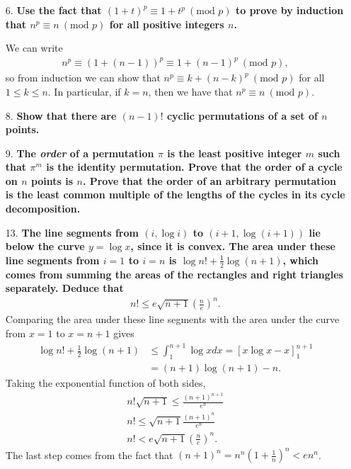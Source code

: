 \documentclass[a4paper,12pt]{article}
\begin{document}
\begin{enumerate}
    \item[6.]
        \boldmath
        \textbf{Use the fact that $(1 + t)^p \equiv 1 + t^p \ (\text{mod } p)$ to prove by induction that $n^p \equiv n \ (\text{mod } p)$ for all positive integers $n$.} \par
        \unboldmath
        We can write
        \begin{align*}
            n^p \equiv (1 + (n - 1))^p \equiv 1 + (n - 1)^p \ (\text{mod } p),
        \end{align*}
        so from induction we can show that $n^p \equiv k + (n - k)^p \ (\text{mod } p)$ for all $1 \leq k \leq n$. In particular, if $k = n$, then we have that $n^p \equiv n\ (\text{mod } p)$.

    \item[8.]
        \boldmath
        \textbf{Show that there are $(n - 1)!$ cyclic permutations of a set of $n$ points.} \par
        \unboldmath

    \item[9.]
        \boldmath
        \textbf{The \textit{order} of a permutation $\pi$ is the least positive integer $m$ such that $\pi^m$ is the identity permutation. Prove that the order of a cycle on $n$ points is $n$. Prove that the order of an arbitrary permutation is the least common multiple of the lengths of the cycles in its cycle decomposition.} \par
        \unboldmath

    \item[13.]
        \boldmath
        \textbf{The line segments from $(i, \log i)$ to $(i + 1, \log(i + 1))$ lie below the curve $y = \log x$, since it is convex. The area under these line segments from $i = 1$ to $i = n$ is $\log n! + \frac{1}{2} \log(n + 1)$, which comes from summing the areas of the rectangles and right triangles separately. Deduce that}
        \begin{align*}
            n! \leq e \sqrt{n + 1} \left( \frac{n}{e} \right)^n.
        \end{align*}
        \unboldmath
        Comparing the area under these line segments with the area under the curve from $x = 1$ to $x = n + 1$ gives
        \begin{align*}
            \log n! + \frac{1}{2} \log(n + 1) &\leq \int_1^{n + 1} \log x dx = [x \log x - x]_1^{n + 1} \\
            &= (n + 1)\log(n + 1) - n.
        \end{align*}
        Taking the exponential function of both sides,
        \begin{gather*}
            n! \sqrt{n + 1} \leq \frac{(n + 1)^{n + 1}}{e^n} \\
            n! \leq \sqrt{n + 1} \frac{(n + 1)^n}{e^n} \\
            n! < e \sqrt{n + 1} \left( \frac{n}{e} \right)^n.
        \end{gather*}
        The last step comes from the fact that $(n + 1)^n = n^n \left( 1 + \frac{1}{n} \right)^n < en^n$.


\end{enumerate}
\end{document}
